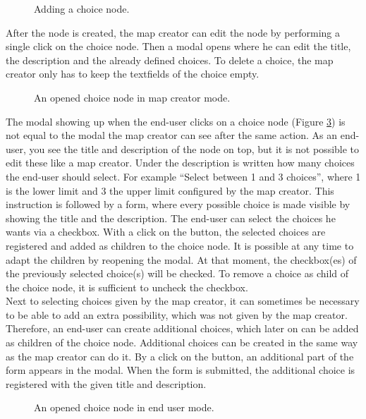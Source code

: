 \begin{figure}[H]
	\centering
	\caption{Adding a choice node.}
	\label{fig:gm-add-choice}
\end{figure}

After the node is created, the map creator can edit the node by performing a single click on the choice node. Then a modal opens where he can edit the title, the description and the already defined choices. To delete a choice, the map creator only has to keep the textfields of the choice empty.

\begin{figure}[H]
	\centering
	\caption{An opened choice node in map creator mode.}
	\label{fig:gm-choicenode-mapcreator}
\end{figure}

The modal showing up when the end-user clicks on a choice node (Figure \ref{fig:gm-choicenode-enduser}) is not equal to the modal the map creator can see after the same action. As an end-user, you see the title and description of the node on top, but it is not possible to edit these like a map creator. Under the description is written how many choices the end-user should select. For example ``Select between 1 and 3 choices'', where 1 is the lower limit and 3 the upper limit configured by the map creator. This instruction is followed by a form, where every possible choice is made visible by showing the title and the description. The end-user can select the choices he wants via a checkbox. With a click on the button, the selected choices are registered and added as children to the choice node. It is possible at any time to adapt the children by reopening the modal. At that moment, the checkbox(es) of the previously selected choice(s) will be checked. To remove a choice as child of the choice node, it is sufficient to uncheck the checkbox.\\

Next to selecting choices given by the map creator, it can sometimes be necessary to be able to add an extra possibility, which was not given by the map creator. Therefore, an end-user can create additional choices, which later on can be added as children of the choice node. Additional choices can be created in the same way as the map creator can do it. By a click on the button, an additional part of the form appears in the modal. When the form is submitted, the additional choice is registered with the given title and description.
\begin{figure}[H]
	\centering
	\caption{An opened choice node in end user mode.}
	\label{fig:gm-choicenode-enduser}
\end{figure}



